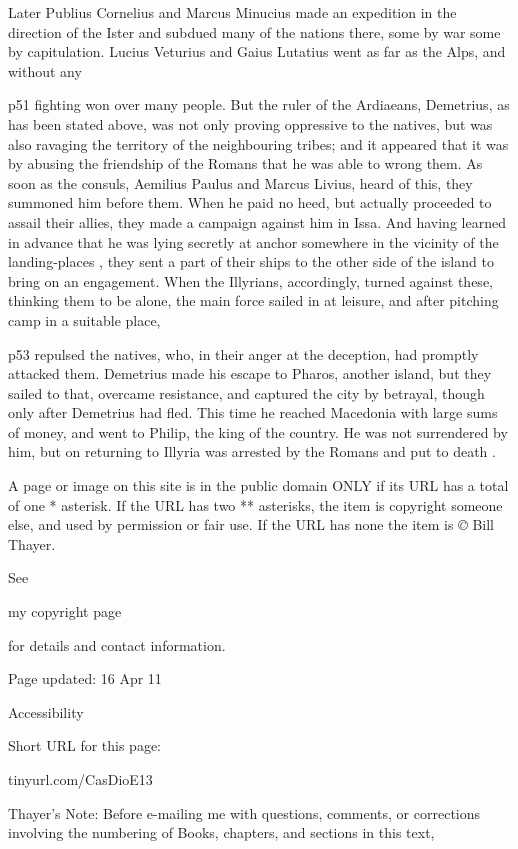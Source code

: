 Later Publius Cornelius and Marcus Minucius made an expedition in the direction of the Ister and subdued many of the nations there, some by war some by capitulation. Lucius Veturius and Gaius Lutatius went as far as the Alps, and without any

p51 fighting won over many people. But the ruler of the Ardiaeans, Demetrius, as has been stated above, was not only proving oppressive to the natives, but was also ravaging the territory of the neighbouring tribes; and it appeared that it was by abusing the friendship of the Romans that he was able to wrong them. As soon as the consuls, Aemilius Paulus and Marcus Livius, heard of this, they summoned him before them. When he paid no heed, but actually proceeded to assail their allies, they made a campaign against him in Issa. And having learned in advance that he was lying secretly at anchor somewhere in the vicinity of the landing-places , they sent a part of their ships to the other side of the island to bring on an engagement. When the Illyrians, accordingly, turned against these, thinking them to be alone, the main force sailed in at leisure, and after pitching camp in a suitable place,

p53 repulsed the natives, who, in their anger at the deception, had promptly attacked them. Demetrius made his escape to Pharos, another island, but they sailed to that, overcame resistance, and captured the city by betrayal, though only after Demetrius had fled. This time he reached Macedonia with large sums of money, and went to Philip, the king of the country. He was not surrendered by him, but on returning to Illyria was arrested by the Romans and put to death .

A page or image on this site is in the public domain ONLY if its URL has a total of one * asterisk. If the URL has two ** asterisks, the item is copyright someone else, and used by permission or fair use. If the URL has none the item is \emph{©} Bill Thayer.

See

my copyright page

for details and contact information.

Page updated:
16 Apr 11

Accessibility


Short URL for this page:

tinyurl.com/CasDioE13

Thayer's Note: Before e-mailing me with questions, comments, or corrections involving the numbering of Books, chapters, and sections in this text,


